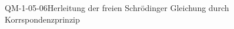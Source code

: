 
\begin{CONC}{QM-1-05-06}{Herleitung der freien Schrödinger Gleichung durch Korrspondenzprinzip}
\end{CONC}
